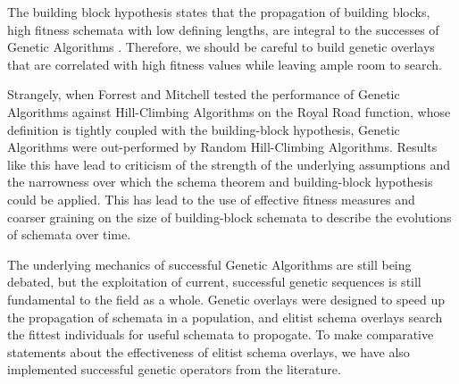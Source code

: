 The building block hypothesis states that the propagation of building blocks, high fitness schemata with low defining lengths, are integral to the successes of Genetic Algorithms \cite{Goldberg89}. Therefore, we should be careful to build genetic overlays that are correlated with high fitness values while leaving ample room to search.

Strangely, when Forrest and Mitchell tested the performance of Genetic Algorithms against Hill-Climbing Algorithms on the Royal Road function, whose definition is tightly coupled with the building-block hypothesis, Genetic Algorithms were out-performed by Random Hill-Climbing Algorithms\cite{Forrest93}. Results like this have lead to criticism of the strength of the underlying assumptions and the narrowness over which the schema theorem and building-block hypothesis could be applied\cite{Burjorjee08, Senaratna05}. This has lead to the use of effective fitness measures and coarser graining on the size of building-block schemata to describe the evolutions of schemata over time\cite{Stephens99}.

The underlying mechanics of successful Genetic Algorithms are still being debated, but the exploitation of current, successful genetic sequences is still fundamental to the field as a whole\cite{Russell10, Senaratna05}. Genetic overlays were designed to speed up the propagation of schemata in a population, and elitist schema overlays search the fittest individuals for useful schemata to propogate. To make comparative statements about the effectiveness of elitist schema overlays, we have also implemented successful genetic operators from the literature.